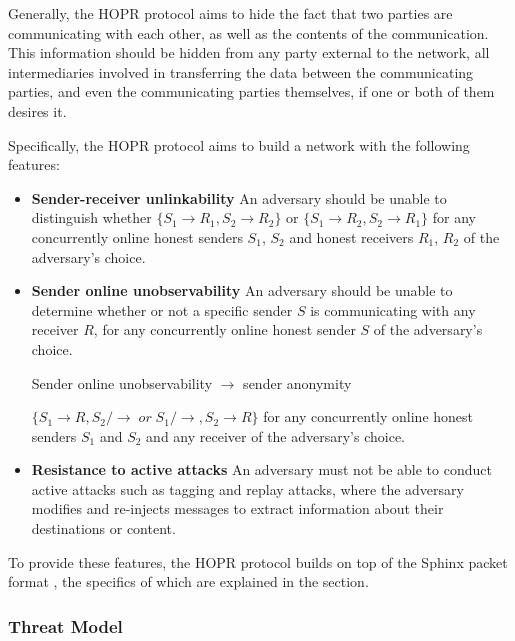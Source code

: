 Generally, the HOPR protocol aims to hide the fact that two parties are communicating with each other, as well as the contents of the communication. This information should be hidden from any party external to the network, all intermediaries involved in transferring the data between the communicating parties, and even the communicating parties themselves, if one or both of them desires it.

Specifically, the HOPR protocol aims to build a network with the following features:

\begin{itemize}

    \item \textbf{Sender-receiver unlinkability}
          An adversary should be unable to distinguish whether $\{S_1\rightarrow R_1, S_2\rightarrow R_2\}$ or $\{S_1\rightarrow R_2, S_2\rightarrow R_1\}$ for any concurrently online honest senders $S_1$, $S_2$ and honest receivers $R_1$, $R_2$ of the adversary’s choice.
    \item \textbf{Sender online unobservability}
          An adversary should be unable to determine whether or not a specific sender $S$ is communicating with any receiver $R$, for any concurrently online honest sender $S$ of the adversary’s choice.
          \begin{center}
              Sender online unobservability $\rightarrow$ sender anonymity
          \end{center}
          $\{S_1 \rightarrow R,S_2 /\rightarrow \;or\; S_1 /\rightarrow,S_2 \rightarrow R\}$ for any concurrently online honest senders $S_1$ and $S_2$ and any receiver of the adversary’s choice.


    \item \textbf{Resistance to active attacks}
          An adversary must not be able to conduct active attacks such as tagging and replay attacks, where the adversary modifies and re-injects messages to extract information about their destinations or
          content.

\end{itemize}
To provide these features, the HOPR protocol builds on top of the Sphinx packet format \cite{sphinxpaper}, the specifics of which are explained in the  section.


\subsubsection{Threat Model}


